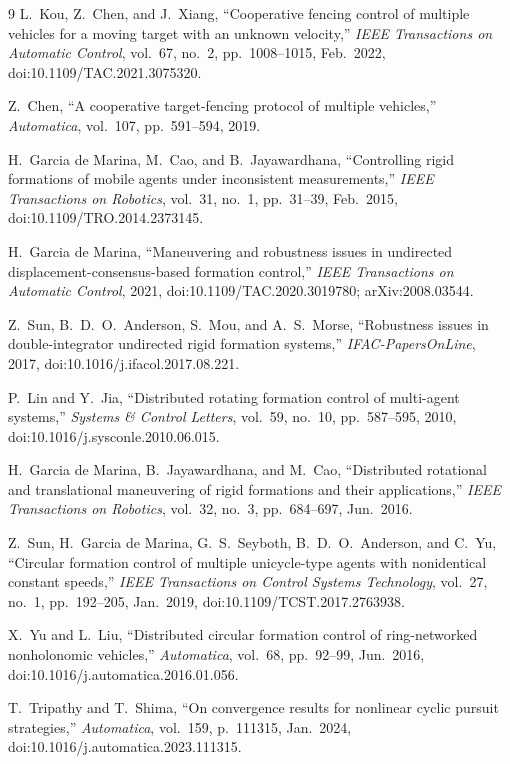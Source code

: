 \documentclass[11pt,a4paper]{ctexart}
\theoremstyle{plain}
\theoremstyle{definition}
\theoremstyle{remark}
\begin{document}
\begin{thebibliography}{9}
L.~Kou, Z.~Chen, and J.~Xiang,
``Cooperative fencing control of multiple vehicles for a moving target with an unknown velocity,''
\emph{IEEE Transactions on Automatic Control}, vol.~67, no.~2, pp.~1008--1015, Feb.~2022,
doi:10.1109/TAC.2021.3075320.

Z.~Chen,
``A cooperative target-fencing protocol of multiple vehicles,''
\emph{Automatica}, vol.~107, pp.~591--594, 2019.

H.~Garcia de Marina, M.~Cao, and B.~Jayawardhana,
``Controlling rigid formations of mobile agents under inconsistent measurements,''
\emph{IEEE Transactions on Robotics}, vol.~31, no.~1, pp.~31--39, Feb.~2015,
doi:10.1109/TRO.2014.2373145.

H.~Garcia de Marina,
``Maneuvering and robustness issues in undirected displacement-consensus-based formation control,''
\emph{IEEE Transactions on Automatic Control}, 2021,
doi:10.1109/TAC.2020.3019780; arXiv:2008.03544.

Z.~Sun, B.~D.~O.~Anderson, S.~Mou, and A.~S.~Morse,
``Robustness issues in double-integrator undirected rigid formation systems,''
\emph{IFAC-PapersOnLine}, 2017, doi:10.1016/j.ifacol.2017.08.221.

P.~Lin and Y.~Jia,
``Distributed rotating formation control of multi-agent systems,'' 
\emph{Systems \& Control Letters}, vol.~59, no.~10, pp.~587--595, 2010,
doi:10.1016/j.sysconle.2010.06.015.

H.~Garcia de Marina, B.~Jayawardhana, and M.~Cao,
``Distributed rotational and translational maneuvering of rigid formations and their applications,''
\emph{IEEE Transactions on Robotics}, vol.~32, no.~3, pp.~684--697, Jun.~2016.

Z.~Sun, H.~Garcia de Marina, G.~S.~Seyboth, B.~D.~O.~Anderson, and C.~Yu,
``Circular formation control of multiple unicycle-type agents with nonidentical constant speeds,''
\emph{IEEE Transactions on Control Systems Technology}, vol.~27, no.~1, pp.~192--205, Jan.~2019,
doi:10.1109/TCST.2017.2763938.

X.~Yu and L.~Liu,
``Distributed circular formation control of ring-networked nonholonomic vehicles,''
\emph{Automatica}, vol.~68, pp.~92--99, Jun.~2016, doi:10.1016/j.automatica.2016.01.056.

T.~Tripathy and T.~Shima,
``On convergence results for nonlinear cyclic pursuit strategies,''
\emph{Automatica}, vol.~159, p.~111315, Jan.~2024, doi:10.1016/j.automatica.2023.111315.


\end{thebibliography}
\end{document}
